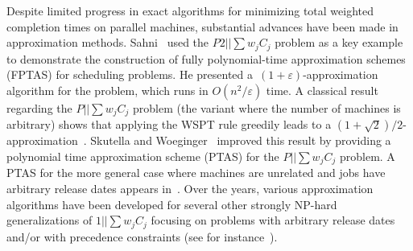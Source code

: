 \documentclass[11pt]{llncs}
\begin{document}
Despite limited progress in exact algorithms for minimizing total weighted completion times on parallel machines, substantial advances have been made in approximation methods. Sahni~\cite{SahniFPTAS} used the $P2||\sum w_jC_j$ problem as a key example to demonstrate the construction of fully polynomial-time approximation schemes (FPTAS) for scheduling problems. He presented a~$(1+\varepsilon)$-approximation algorithm for the problem, which runs in $O(n^2/\varepsilon)$ time. A classical result regarding the $P||\sum w_j C_j$ problem (the variant where the number of machines is arbitrary) shows that applying the WSPT rule greedily leads to a $(1+\sqrt{2})/2$-approximation~\cite{KK1986}. Skutella and Woeginger~\cite{DBLP:conf/stoc/SkutellaW99} improved this result by providing a polynomial time approximation scheme (PTAS) for the $P||\sum w_j C_j$ problem. A PTAS for the more general case where
machines are unrelated and jobs have arbitrary release dates appears in~\cite{DBLP:conf/focs/AfratiBCKKKMQSSS99}. Over the years, various approximation algorithms have been developed for several other strongly NP-hard generalizations of $1||\sum w_j C_j$ focusing on problems with arbitrary release dates and/or with precedence constraints (see for instance~\cite{DBLP:conf/stoc/BansalSS16,DBLP:journals/mp/CorreaM22,DBLP:conf/focs/ImL16,DBLP:conf/sosa/JagerW24,Jaeger:18:Approximating-total-weighted,DBLP:conf/focs/Li17,SittersYang:17:A-2+epsilon-approximation}). 

\end{document}
